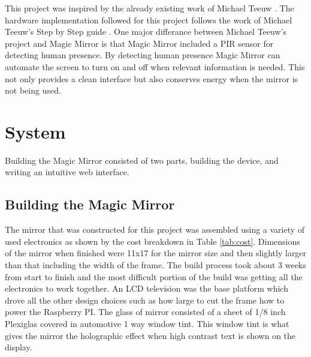 \documentclass[conference]{IEEEtran}
\begin{document}
This project was inspired by the already existing work of Michael Teeuw \cite{teeuw}. The hardware implementation followed for this project follows the work of Michael Teeuw's Step by Step guide \cite{mteeuw}. One major differance between Michael Teeuw's project and Magic Mirror is that Magic Mirror included a PIR sensor for detecting human presence. By detecting human presence Magic Mirror can automate the screen to turn on and off when relevant information is needed. This not only provides a clean interface but also conserves energy when the mirror is not being used.

\section{System} 
Building the Magic Mirror consisted of two parts, building the device, and writing an intuitive web interface.
\subsection{Building the Magic Mirror}
The mirror that was constructed for this project was assembled using a variety of used electronics as shown by the cost breakdown in Table \ref{tab:cost}.
Dimensions of the mirror when finished were 11x17 for the mirror size and then slightly larger than that including the width of the frame.
The build process took about 3 weeks from start to finish and the most difficult portion of the build was getting all the electronics to work together.
An LCD television was the base platform which drove all the other design choices such as how large to cut the frame how to power the Raspberry PI.
The glass of mirror consisted of a sheet of 1/8 inch Plexiglas covered in automotive 1 way window tint.
This window tint is what gives the mirror the holographic effect when high contrast text is shown on the display.
\end{document}
